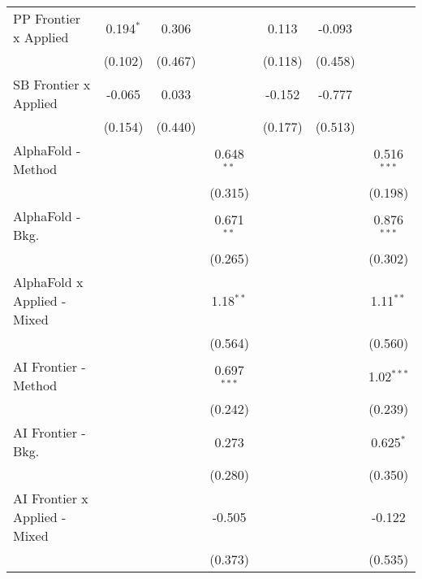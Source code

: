 \begin{tabular}{lcccccc}
   PP Frontier x Applied          & 0.194$^{*}$   & 0.306       &               & 0.113         & -0.093       &   \\   
                                  & (0.102)       & (0.467)     &               & (0.118)       & (0.458)      &   \\   
   SB Frontier x Applied          & -0.065        & 0.033       &               & -0.152        & -0.777       &   \\   
                                  & (0.154)       & (0.440)     &               & (0.177)       & (0.513)      &   \\   
   AlphaFold - Method             &               &             & 0.648$^{**}$  &               &              & 0.516$^{***}$\\   
                                  &               &             & (0.315)       &               &              & (0.198)\\   
   AlphaFold - Bkg.               &               &             & 0.671$^{**}$  &               &              & 0.876$^{***}$\\   
                                  &               &             & (0.265)       &               &              & (0.302)\\   
   AlphaFold x Applied - Mixed    &               &             & 1.18$^{**}$   &               &              & 1.11$^{**}$\\   
                                  &               &             & (0.564)       &               &              & (0.560)\\   
   AI Frontier - Method           &               &             & 0.697$^{***}$ &               &              & 1.02$^{***}$\\   
                                  &               &             & (0.242)       &               &              & (0.239)\\   
   AI Frontier - Bkg.             &               &             & 0.273         &               &              & 0.625$^{*}$\\   
                                  &               &             & (0.280)       &               &              & (0.350)\\   
   AI Frontier x Applied - Mixed  &               &             & -0.505        &               &              & -0.122\\   
                                  &               &             & (0.373)       &               &              & (0.535)\\   

\end{tabular}
